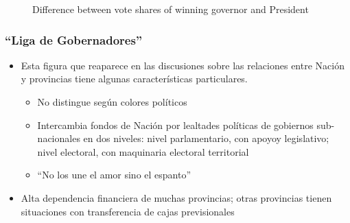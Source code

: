 \documentclass[a4paper,handout,mathserif,final,xcolor=dvipsnames,twocolumn]{beamer}
\begin{document}
\begin{frame}
\begin{figure}
  \caption{Difference between vote shares of winning governor and President}
    \label{fig:foobar}
    \end{figure}
  \end{frame}



\begin{frame}\frametitle{``Liga de Gobernadores''}
  \begin{itemize}\itemsep 10pt
  \item Esta figura que reaparece en las discusiones sobre las
    relaciones entre Nación y provincias tiene algunas características
    particulares.
    \begin{itemize}
    \item No distingue según colores políticos
      \item Intercambia fondos de Nación por lealtades políticas de
        gobiernos sub-nacionales en dos niveles: nivel parlamentario,
        con apoyoy legislativo; nivel electoral, con maquinaria
        electoral territorial
        \item ``No los une el amor sino el espanto''
     \end{itemize}
    \item Alta dependencia financiera de muchas provincias; otras
      provincias tienen situaciones con transferencia de cajas previsionales
    \end{itemize}
  \end{frame}
\end{document}
